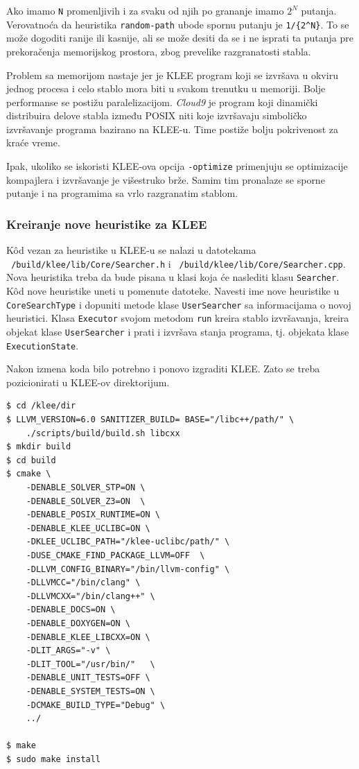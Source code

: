 Ako imamo \texttt{N} promenljivih i za svaku od njih po grananje imamo \(2^N\) putanja. Verovatnoća da heuristika \texttt{random-path} ubode spornu putanju je \texttt{1/\{2\^{}N\}}. To se može dogoditi ranije ili kasnije, ali se može desiti da se i ne isprati ta putanja pre prekoračenja memorijskog prostora, zbog prevelike razgranatosti stabla.

Problem sa memorijom nastaje jer je KLEE program koji se izvršava u okviru jednog procesa i celo stablo mora biti u svakom trenutku u memoriji. Bolje performanse se postižu paralelizacijom. \emph{Cloud9} je program koji dinamički distribuira delove stabla između POSIX niti koje izvršavaju simboličko izvršavanje programa bazirano na KLEE-u. Time postiže bolju pokrivenost za kraće vreme.

Ipak, ukoliko se iskoristi KLEE-ova opcija \texttt{-optimize} primenjuju se optimizacije kompajlera i izvršavanje je višestruko brže. Samim tim pronalaze se sporne putanje i na programima sa vrlo razgranatim stablom.

\subsubsection{Kreiranje nove heuristike za KLEE}\label{kreiranje-nove-heuristike-za-klee}

Kôd vezan za heuristike u KLEE-u se nalazi u datotekama \texttt{~/build/klee/lib/Core/Searcher.h} i \texttt{~/build/klee/lib/Core/Searcher.cpp}. Nova heuristika treba da bude pisana u klasi koja će naslediti klasu \texttt{Searcher}. Kôd nove heuristike uneti u pomenute datoteke. Navesti ime nove heuristike u \texttt{CoreSearchType} i dopuniti metode klase \texttt{UserSearcher} sa informacijama o novoj heuristici. Klasa \texttt{Executor} svojom metodom \texttt{run} kreira stablo izvršavanja, kreira objekat klase \texttt{UserSearcher} i prati i izvršava stanja programa, tj. objekata klase \texttt{ExecutionState}.

Nakon izmena koda bilo potrebno i ponovo izgraditi KLEE. Zato se treba pozicionirati u KLEE-ov direktorijum.

\begin{verbatim}
$ cd /klee/dir
$ LLVM_VERSION=6.0 SANITIZER_BUILD= BASE="/libc++/path/" \
    ./scripts/build/build.sh libcxx
$ mkdir build
$ cd build
$ cmake \
    -DENABLE_SOLVER_STP=ON \
    -DENABLE_SOLVER_Z3=ON  \
    -DENABLE_POSIX_RUNTIME=ON \
    -DENABLE_KLEE_UCLIBC=ON \
    -DKLEE_UCLIBC_PATH="/klee-uclibc/path/" \
    -DUSE_CMAKE_FIND_PACKAGE_LLVM=OFF  \
    -DLLVM_CONFIG_BINARY="/bin/llvm-config" \
    -DLLVMCC="/bin/clang" \
    -DLLVMCXX="/bin/clang++" \
    -DENABLE_DOCS=ON \
    -DENABLE_DOXYGEN=ON \
    -DENABLE_KLEE_LIBCXX=ON \
    -DLIT_ARGS="-v" \
    -DLIT_TOOL="/usr/bin/"   \
    -DENABLE_UNIT_TESTS=OFF \
    -DENABLE_SYSTEM_TESTS=ON \
    -DCMAKE_BUILD_TYPE="Debug" \
    ../

$ make
$ sudo make install
\end{verbatim}
